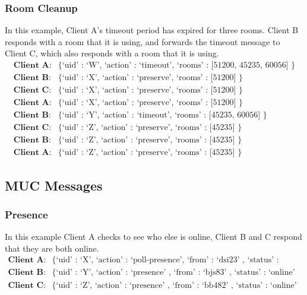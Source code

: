 \documentclass{article}
\begin{document}
\subsubsection{Room Cleanup}

In this example, Client A's timeout period has expired for three rooms. Client B
responds with a room that it is using, and forwards the timeout message to
Client C, which also responds with a room that it is using.
\begin{align*}
\textbf{Client A}:& \text{\{ `uid' : `W', `action' : `timeout', `rooms' : [51200,
45235, 60056] \}}\\
\textbf{Client B}:& \text{\{ `uid' : `X', `action' : `preserve', `rooms' :
[51200] \}}\\
\textbf{Client C}:& \text{\{ `uid' : `X', `action' : `preserve', `rooms' :
[51200] \}}\\
\textbf{Client A}:& \text{\{ `uid' : `X', `action' : `preserve', `rooms' :
[51200] \}}\\
\textbf{Client B}:& \text{\{ `uid' : `Y', `action' : `timeout', `rooms' : [45235,
60056] \}}\\
\textbf{Client C}:& \text{\{ `uid' : `Z', `action' : `preserve', `rooms' :
[45235] \}}\\
\textbf{Client B}:& \text{\{ `uid' : `Z', `action' : `preserve', `rooms' :
[45235] \}}\\
\textbf{Client A}:& \text{\{ `uid' : `Z', `action' : `preserve', `rooms' :
[45235] \}}
\end{align*}

\subsection{MUC Messages}
\subsubsection{Presence}

In this example Client A checks to see who else is online, Client B and C respond
that they are both online.
\begin{align*}
\textbf{Client A}:& \text{\{ `uid' : `X', `action' : `poll-presence', `from' :
`dsi23' , `status' : `online' \}} \\
\textbf{Client B}:& \text{\{ `uid' : `Y', `action' : `presence' , `from' :
`bjs83' , `status' : `online' \}} \\
\textbf{Client C}:& \text{\{ `uid' : `Z', `action' : `presence' , `from' :
`bb482' , `status' : `online' \}} 
\end{align*}
\end{document}

